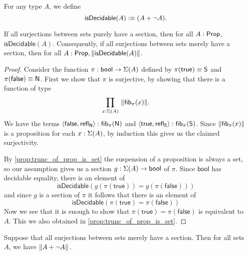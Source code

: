 \begin{defn}
For any  type  $A$, we define
\begin{equation*}
\mathsf{isDecidable}(A)\vcentcolon\equiv  (A+\neg A).
\end{equation*}
\end{defn}

\begin{thm}\label{thm:1surj_to_surj_to_pem}
If all surjections between sets purely have a section, then for all $A:\mathsf{Prop}$,
$\mathsf{isDecidable}(A)$. Consequently, if all surjections between sets merely have a section, then for all $A:\mathsf{Prop},
\left\Vert \mathsf{isDecidable}(A)\right\Vert_{}$.
\end{thm}

\begin{proof}
Consider the function $\pi:\mathsf{bool}\to\Sigma(A)$ defined by 
$\pi(\mathsf{true})\equiv \mathsf{S}$ and $\pi(\mathsf{false})\equiv \mathsf{N}$. 
First  we  show that $\pi$ is surjective, 
by showing that there is a function of type
\begin{equation*}
\prd{x:\susp(A)} \|\hfiber\pi{x}\|.
\end{equation*}
We have the terms 
$\langle{\mathsf{false},\ensuremath{\mathsf{refl}_{\mathsf{N}}}}\rangle:{\mathsf{fib}}_{\pi}(\mathsf{N})$ 
and $\langle{\mathsf{true},\ensuremath{\mathsf{refl}_{\mathsf{S}}}}\rangle:{\mathsf{fib}}_{\pi}(\mathsf{S})$. 
Since $\|{\mathsf{fib}}_{\pi}(x)\|$ is a proposition for each 
$x:\Sigma(A)$, by induction this gives us the claimed surjectivity.

By \autoref{prop:trunc_of_prop_is_set} the suspension of 
a proposition is always a set, so our assumption gives us a 
section $g:\Sigma(A)\to\mathsf{bool}$ of $\pi$. 
Since $\mathsf{bool}$ has decidable equality, there is an element of
\begin{equation*}
\mathsf{isDecidable}(g(\pi(\mathsf{true}))= g(\pi(\mathsf{false})))
\end{equation*}
and since $g$ is a section of $\pi$ it follows that there is an element of
\begin{equation*}
\mathsf{isDecidable}(\pi(\mathsf{true})=\pi(\mathsf{false}))
\end{equation*}
Now we see that it is enough to show that 
$\pi(\mathsf{true})= \pi(\mathsf{false})$ is equivalent to $A$. 
This we also obtained in \autoref{prop:trunc_of_prop_is_set}.
\end{proof}

\begin{cor}\label{cor:ACtoLEM0}
Suppose that all surjections between sets merely have a section. Then for all sets $A$, we have $\left\Vert A + \neg A\right\Vert_{}$.
\end{cor}

